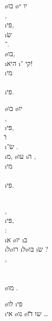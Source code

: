 \begin{twocol}
\begin{stanza}
\o{בו} \o{יו} ״\\
 ,\\
  \i{פי},\\
 \i{שׂ}\\
־.\\
 \o{בו},\\
\i{היא} \i{קי} ־!\\
\i{מי}\\
\\
\i{פי}.
\end{stanza}

\begin{stanza}
\o{בו} \o{יו} \\
 ,\\
  \i{פּי},\\
 \u{ו} \\
\i{שׂ}־ .\\
 \i{מ}, \o{עו}  \i{ה} ,\\
\i{מי}\\
\\
\i{פי}.
\end{stanza}

\begin{stanza}
 \\
 ,\\
    \i{פּי},\\
 :\\
\i{א}  \o{יו}  \i{ב}\\
\i{ל}\o{רו}{\gnuvah} \i{ל}\o{בּו}  \i{שׂ} ?\\
 ,\\
\\
\\
 \o{מו} .
\end{stanza}

\begin{stanza}
 \o{לו}  \i{פי}\\
\i{אי} \o{נו} \o{שו} \u{דו} …
\end{stanza}
\end{twocol}
